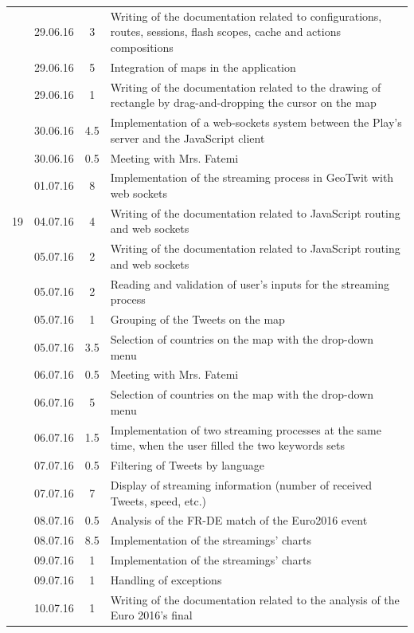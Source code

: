 \documentclass[a4paper,11pt]{report}
\begin{document}
\begin{center}
\begin{longtable}{c|l|c|p{10cm}}
     & 29.06.16 & 3 & Writing of the documentation related to configurations, routes, sessions, flash scopes, cache and actions compositions\\
     & 29.06.16 & 5 & Integration of maps in the application\\
     & 29.06.16 & 1 & Writing of the documentation related to the drawing of rectangle by drag-and-dropping the cursor on the map\\
     & 30.06.16 & 4.5 & Implementation of a web-sockets system between the Play's server and the JavaScript client\\
     & 30.06.16 & 0.5 & Meeting with Mrs. Fatemi\\
     & 01.07.16 & 8 & Implementation of the streaming process in GeoTwit with web sockets\\\hline
    19 & 04.07.16 & 4 & Writing of the documentation related to JavaScript routing and web sockets\\
     & 05.07.16 & 2 & Writing of the documentation related to JavaScript routing and web sockets\\
     & 05.07.16 & 2 & Reading and validation of user's inputs for the streaming process\\
     & 05.07.16 & 1 & Grouping of the Tweets on the map\\
     & 05.07.16 & 3.5 & Selection of countries on the map with the drop-down menu\\
     & 06.07.16 & 0.5 & Meeting with Mrs. Fatemi\\
     & 06.07.16 & 5 & Selection of countries on the map with the drop-down menu\\
     & 06.07.16 & 1.5 & Implementation of two streaming processes at the same time, when the user filled the two keywords sets\\
     & 07.07.16 & 0.5 & Filtering of Tweets by language\\
     & 07.07.16 & 7 & Display of streaming information (number of received Tweets, speed, etc.)\\
     & 08.07.16 & 0.5 & Analysis of the FR-DE match of the Euro2016 event\\
     & 08.07.16 & 8.5 & Implementation of the streamings' charts\\
     & 09.07.16 & 1 & Implementation of the streamings' charts\\
     & 09.07.16 & 1 & Handling of exceptions\\
     & 10.07.16 & 1 & Writing of the documentation related to the analysis of the Euro 2016's final\\\hline

\end{longtable}
\end{center}
\end{document}
